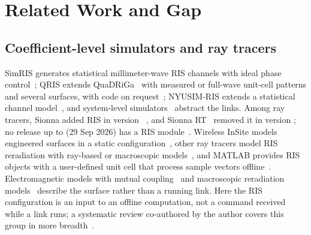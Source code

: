 \section{Related Work and Gap}\label{sec:related}

\subsection{Coefficient-level simulators and ray tracers}
SimRIS generates statistical millimeter-wave RIS channels with ideal phase
control~\cite{Basar2020SimRIS,Basar2021TCOM}; QRIS extends QuaDRiGa~\cite{Jaeckel2014QuaDRiGa}
with measured or full-wave unit-cell patterns and several surfaces, with code on
request~\cite{Burtakov2023QRIS,QRISPage}; NYUSIM-RIS extends a statistical channel
model~\cite{Habib2023NYUSIMRIS}, and system-level simulators~\cite{Hao2023ViennaRIS,Sihlbom2023SLS}
abstract the links. Among ray tracers, Sionna added
RIS in version \txtRepSionnaRisAddedVersion~\cite{SionnaV018Release}, and Sionna
RT~\cite{Hoydis2023SionnaRT,AitAoudia2025SionnaRTReport} removed it in version
\txtRepSionnaRisRemovedVersion; no release up to \txtRepSionnaLatestVersion{} (29 Sep 2026)
has a RIS module~\cite{SionnaRTReleases}. Wireless InSite models engineered surfaces in a
static configuration~\cite{RemcomEES,DeJong2022EES}, other ray tracers model RIS reradiation
with ray-based or macroscopic
models~\cite{Vitucci2023RayRIS,Sandh2024RTRIS,Herold2023RISRayTracing,Habib2025CloudRT,Karakelle2026DTRIS},
and MATLAB provides RIS objects with a user-defined unit cell that process sample vectors
offline~\cite{MathWorksRectangularRIS,MathWorksRISCDL}. Electromagnetic models with mutual
coupling~\cite{Faqiri2023PhysFad,Gradoni2021MutualCoupling} and macroscopic reradiation
models~\cite{DegliEsposti2022Reradiation} describe the surface rather than a running link. Here the
RIS configuration is an input to an offline computation, not a command received while a link
runs; a systematic review co-authored by the author covers this group in
more breadth~\cite{Kaur2026SLR}.

